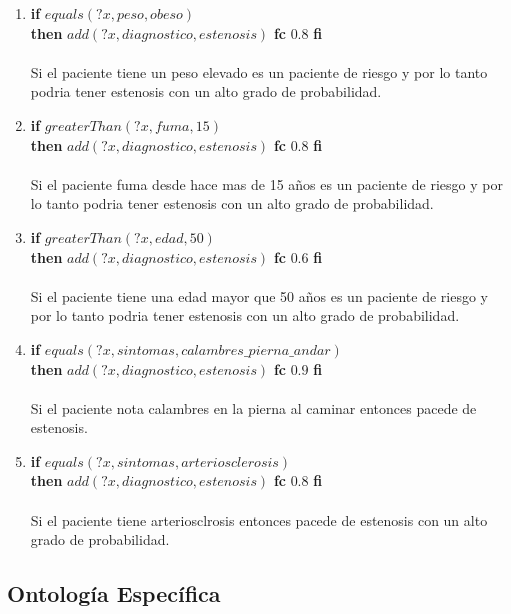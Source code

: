 \documentclass[10pt, a4paper,spanish]{article}
\begin{document}
\begin{enumerate}[label={\textbf{R\theenumi:}}]
				\item
					\textbf{if} $equals(?x, peso, obeso)$ \\
					\textbf{then} $add(?x, diagnostico, estenosis)$ \textbf{fc} $0.8$ \textbf{fi}
					\\ \\
					Si el paciente tiene un peso elevado es un paciente de riesgo y por lo tanto podria tener estenosis con un alto grado de probabilidad.

				\item
					\textbf{if} $greaterThan(?x, fuma, 15)$ \\
					\textbf{then} $add(?x, diagnostico, estenosis)$ \textbf{fc} $0.8$ \textbf{fi}
					\\ \\
					Si el paciente fuma desde hace mas de 15 años es un paciente de riesgo y por lo tanto podria tener estenosis con un alto grado de probabilidad.

				\item
					\textbf{if} $greaterThan(?x, edad, 50)$ \\
					\textbf{then} $add(?x, diagnostico, estenosis)$ \textbf{fc} $0.6$ \textbf{fi}
					\\ \\
					Si el paciente tiene una edad mayor que 50 años es un paciente de riesgo y por lo tanto podria tener estenosis con un alto grado de probabilidad.

				\item
					\textbf{if} $equals(?x, sintomas, calambres\_pierna\_andar)$ \\
					\textbf{then} $add(?x, diagnostico, estenosis)$ \textbf{fc} $0.9$ \textbf{fi}
					\\ \\
					Si el paciente nota calambres en la pierna al caminar entonces pacede de estenosis.

				\item
					\textbf{if} $equals(?x, sintomas, arteriosclerosis)$ \\
					\textbf{then} $add(?x, diagnostico, estenosis)$ \textbf{fc} $0.8$ \textbf{fi}
					\\ \\
					Si el paciente tiene arteriosclrosis entonces pacede de estenosis con un alto grado de probabilidad.
			\end{enumerate}

		\subsection{Ontología Específica}
\end{document}
